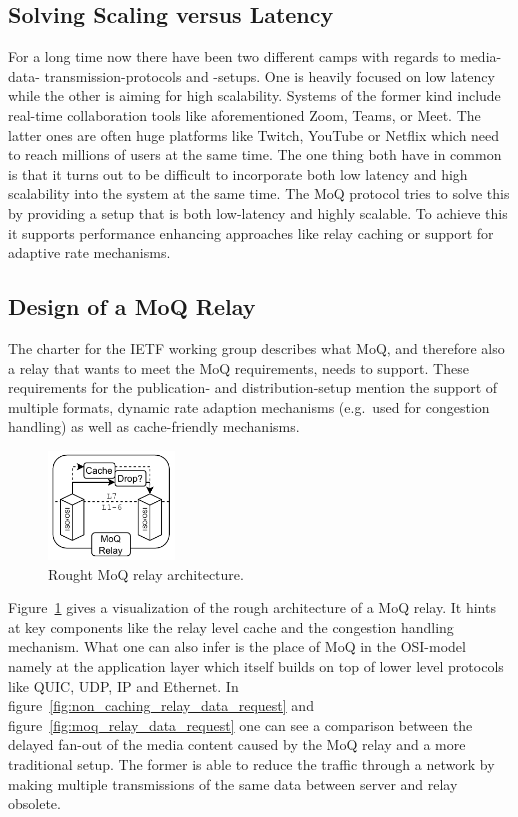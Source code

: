 \subsection{Solving Scaling versus Latency}
For a long time now there have been two different camps with regards to media-data-
transmission-protocols and -setups.
One is heavily focused on low latency while the other is aiming for high scalability.
Systems of the former kind include real-time collaboration tools like aforementioned
Zoom, Teams, or Meet.
The latter ones are often huge platforms like Twitch, YouTube or Netflix which need to 
reach millions of users at the same time.
The one thing both have in common is that it turns out to be difficult to incorporate both 
low latency and high scalability into the system at the same time.
The MoQ protocol tries to solve this by providing a setup that is both low-latency and
highly scalable.
To achieve this it supports performance enhancing approaches like relay caching or support 
for adaptive rate mechanisms. %

\subsection{Design of a MoQ Relay}
The charter for the IETF working group describes what MoQ, and therefore also a relay 
that wants to meet the MoQ requirements, needs to support.
These requirements for the publication- and distribution-setup mention the support of 
multiple formats, dynamic rate adaption mechanisms (e.g.~used for congestion handling)
as well as cache-friendly mechanisms.

\begin{figure}
    \centering
    \includegraphics[width=0.3\textwidth]{figures/02_background/moq-relay.drawio.pdf}
    \caption{Rought MoQ relay architecture.}\label{fig:moq_relay_architecture}
\end{figure}

Figure~\ref{fig:moq_relay_architecture} gives a visualization of the rough architecture
of a MoQ relay.
It hints at key components like the relay level cache and the congestion handling
mechanism.
What one can also infer is the place of MoQ in the OSI-model namely at the application
layer which itself builds on top of lower level protocols like QUIC, UDP, IP and Ethernet.
In figure~\ref{fig:non_caching_relay_data_request} and figure~\ref{fig:moq_relay_data_request} 
one can see a comparison between the delayed fan-out of the media content caused by the MoQ 
relay and a more traditional setup.
The former is able to reduce the traffic through a network by making multiple transmissions
of the same data between server and relay obsolete.

